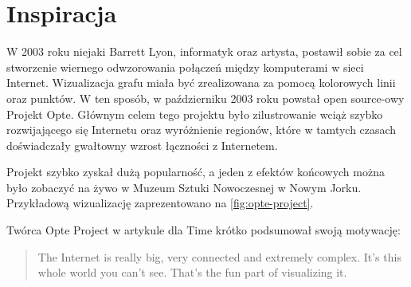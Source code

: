 \section{Inspiracja}
W 2003 roku niejaki Barrett Lyon, informatyk oraz artysta, postawił sobie za cel stworzenie wiernego odwzorowania połączeń między komputerami w sieci Internet. Wizualizacja grafu miała być zrealizowana za pomocą kolorowych linii oraz punktów. W ten sposób, w październiku 2003 roku powstał open source-owy Projekt Opte. Głównym celem tego projektu było zilustrowanie wciąż szybko rozwijającego się Internetu oraz wyróżnienie regionów, które w tamtych czasach doświadczały gwałtowny wzrost łączności z Internetem.

Projekt szybko zyskał dużą popularność, a jeden z efektów końcowych można było zobaczyć na żywo w Muzeum Sztuki Nowoczesnej w Nowym Jorku. Przykładową wizualizację zaprezentowano na \ref{fig:opte-project}.

Twórca Opte Project w artykule dla Time \cite{OpteProject:Time} krótko podsumował swoją motywację:

\begin{center}
	\hyphenblockcquote{USenglish}{OpteProject:Time}{
		The Internet is really big, very connected and extremely complex. \linebreak
		It’s this whole world you can’t see. That’s the fun part of visualizing it.
	}
\end{center}

